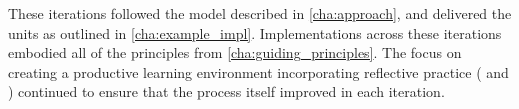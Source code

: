 These iterations followed the model described in \cref{cha:approach}, and delivered the units as outlined in \cref{cha:example_impl}. Implementations across these iterations embodied all of the principles from \cref{cha:guiding_principles}. The focus on creating a productive learning environment incorporating reflective practice ( and ) continued to ensure that the process itself improved in each iteration.



 


